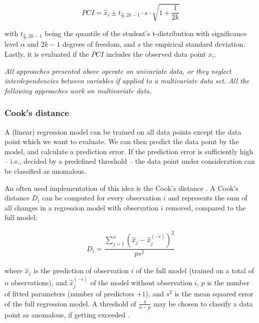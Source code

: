 \documentclass[conference]{IEEEtran}
\begin{document}
\begin{equation} \label{eq:pci}
    PCI = \hat{x}_i \pm t_{\frac{\alpha}{2},2k-1} \cdot s \cdot \sqrt{1+\frac{1}{2k}}
\end{equation}

with $t_{\frac{\alpha}{2},2k-1}$ being the quantile of the student's t-distribution with significance level $\alpha$ and $2k-1$ degrees of freedom, and $s$ the empirical standard deviation. Lastly, it is evaluated if the $PCI$ includes the observed data point $x_i$.

\hspace{1em}

\textit{All approaches presented above operate on univariate data, or they neglect interdependencies between variables if applied to a multivariate data set. All the following approaches work on multivariate data.}

\hspace{1em}


\subsubsection{Cook's distance}

A (linear) regression model can be trained on all data points except the data point which we want to evaluate. We can then predict the data point by the model, and calculate a prediction error. If the prediction error is sufficiently high -- i.e., decided by a predefined threshold -- the data point under consideration can be classified as anomalous.

An often used implementation of this idea is the Cook's distance \cite{cook1977detection}. A Cook's distance $D_i$ can be computed for every observation $i$ and represents the sum of all changes in a regression model with observation $i$ removed, compared to the full model:

\begin{eqnarray}
    D_i = \dfrac{\sum \limits_{j=1}^n (\hat{x}_j - \hat{x}_j^{(-i)})^2 }{ps^2}
\end{eqnarray}

where $\hat{x}_j$ is the prediction of observation $i$ of the full model (trained on a total of $n$ observations), and $\hat{x}_j^{(-i)}$ of the model without observation $i$, $p$ is the number of fitted parameters (number of predictors $+1$), and $s^2$ is the mean squared error of the full regression model.
A threshold of $\frac{4}{n-p}$ may be chosen to classify a data point as anomalous, if getting exceeded \cite{rahman2012multiple}.
\end{document}
